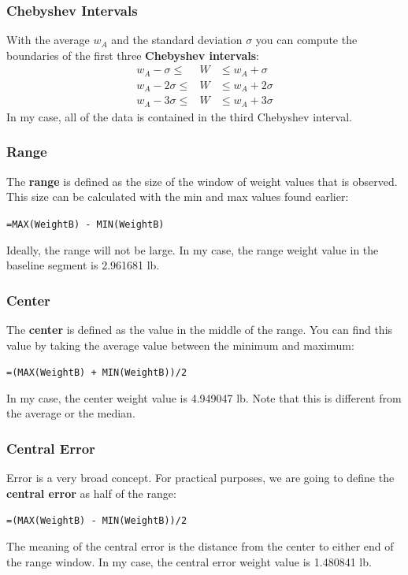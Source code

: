 \subsubsection{Chebyshev Intervals}
With the average $w_{A}$ and the standard deviation $\sigma$ you can compute the boundaries of the first three \textbf{Chebyshev intervals}:
\begin{eqnarray}
    w_{A} - \sigma \leq &W& \leq w_{A} + \sigma \\
    w_{A} - 2\sigma \leq &W& \leq w_{A} + 2\sigma \\
    w_{A} - 3\sigma \leq &W& \leq w_{A} + 3\sigma
\end{eqnarray}
In my case, all of the data is contained in the third Chebyshev interval.
\subsubsection{Range}
The \textbf{range} is defined as the size of the window of weight values that is observed. This size can be calculated with the min and max values found earlier:
\begin{center}
    \texttt{=MAX(WeightB) - MIN(WeightB)}
\end{center}
Ideally, the range will not be large. In my case, the range weight value in the baseline segment is 2.961681 lb.
\subsubsection{Center}
The \textbf{center} is defined as the value in the middle of the range. You can find this value by taking the average value between the minimum and maximum:
\begin{center}
    \texttt{=(MAX(WeightB) + MIN(WeightB))/2}
\end{center}
In my case, the center weight value is 4.949047 lb. Note that this is different from the average or the median.
\subsubsection{Central Error}
Error is a very broad concept. For practical purposes, we are going to define the \textbf{central error} as half of the range:
\begin{center}
    \texttt{=(MAX(WeightB) - MIN(WeightB))/2}
\end{center}
The meaning of the central error is the distance from the center to either end of the range window. In my case, the central error weight value is 1.480841 lb.
